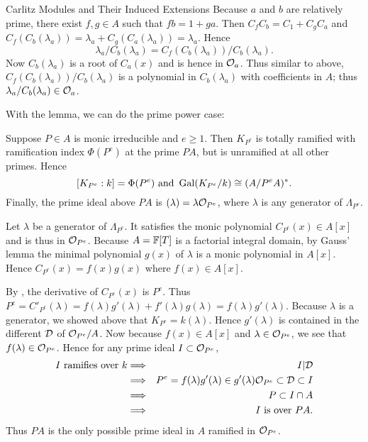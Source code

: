 \documentclass[12pt]{article}
\begin{document}
\begin{section}{Carlitz Modules and Their Induced Extensions}
Because $a$ and $b$ are relatively prime, there exist $f, g \in A$ such
that $fb = 1 + ga$.  Then $C_fC_b = C_1 + C_gC_a$ and $C_f(C_b(\lambda_a))
= \lambda_a + C_g(C_a(\lambda_a)) = \lambda_a$.  Hence
$$\lambda_a/C_b(\lambda_a) = C_f(C_b(\lambda_a))/C_b(\lambda_a).$$
Now $C_b(\lambda_a)$ is a root of $C_a(x)$ and is hence in ${\mathcal O}_a$.  Thus
similar to above, $C_f(C_b(\lambda_a))/C_b(\lambda_a)$ is a polynomial in
$C_b(\lambda_a)$ with coefficients in $A$; thus $\lambda_a/C_b(\lambda_a)
\in {\mathcal O}_a$.
\hamlos

With the lemma, we can do the prime power case:
\begin{proposition}
Suppose $P \in A$ is monic irreducible and $e \geq 1$.  Then $K_{P^e}$ is
totally ramified with ramification index $\Phi(P^e)$ at the prime $PA$,
but is unramified at all other primes.  Hence
$$[K_{P^e}:k] = \Phi(P^e) \text{ and } \operatorname{Gal}(K_{P^e}/k) \cong (A/P^eA)^*.$$
Finally, the prime ideal above $PA$ is $(\lambda) = \lambda{\mathcal O}_{P^e}$,
where $\lambda$ is any generator of $\Lambda_{P^e}$.
\end{proposition}

\pf
Let $\lambda$ be a generator of $\Lambda_{P^e}$.  It satisfies the monic
polynomial $C_{P^e}(x) \in A[x]$ and is thus in ${\mathcal O}_{P^e}$.  Because
$A = {\mathbb F}[T]$ is a factorial integral domain, by Gauss' lemma the minimal
polynomial $g(x)$ of $\lambda$ is a monic polynomial in $A[x]$.  Hence
$C_{P^e}(x) = f(x)g(x)$ where $f(x) \in A[x]$.

By , the derivative of $C_{P^e}(x)$ is $P^e$.  Thus
$P^e = C'_{P^e}(\lambda) = f(\lambda)g'(\lambda) + f'(\lambda)g(\lambda) =
f(\lambda)g'(\lambda)$.  Because $\lambda$ is a generator, we showed above
that $K_{P^e} = k(\lambda)$.  Hence $g'(\lambda)$ is contained in the
different ${\mathcal D}$ of ${\mathcal O}_{P^e}/A$.  Now because $f(x) \in A[x]$ and
$\lambda \in {\mathcal O}_{P^e}$, we see that $f(\lambda) \in {\mathcal O}_{P^e}$.  Hence
for any prime ideal $I \subset {\mathcal O}_{P^e}$,
\begin{eqnarray*}
I \text{ ramifies over }k & \Longrightarrow & I|{\mathcal D} \\
& \Longrightarrow & P^e = f(\lambda)g'(\lambda) \in g'(\lambda){\mathcal O}_{P^e}
\subset {\mathcal D} \subset I \\
& \Longrightarrow & P \subset I\cap A \\
& \Longrightarrow & I \text{ is over } PA.
\end{eqnarray*}
Thus $PA$ is the only possible prime ideal in $A$ ramified in ${\mathcal O}_{P^e}$.


\end{section}
\end{document}
